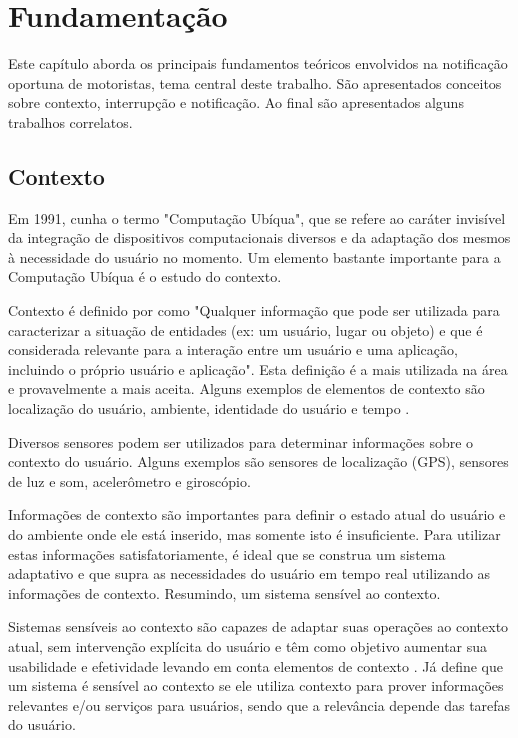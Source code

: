 
\chapter{Fundamentação}
\label{fundamentacao}
Este capítulo aborda os principais fundamentos teóricos envolvidos na notificação oportuna de motoristas,
tema central deste trabalho. São apresentados conceitos sobre contexto, interrupção e notificação.
Ao final são apresentados alguns trabalhos correlatos.

\section{Contexto}
\label{contexto}
Em 1991, \cite{weiser1991computer} cunha o termo "Computação Ubíqua", que se refere ao caráter invisível da
integração de dispositivos computacionais diversos e da adaptação dos mesmos à necessidade do usuário no momento.
Um elemento bastante importante para a Computação Ubíqua é o estudo do contexto.

Contexto é definido por \cite{dey2001understanding} como "Qualquer informação que pode ser utilizada para
caracterizar a situação de entidades (ex: um usuário, lugar ou objeto) e que é considerada relevante para
a interação entre um usuário e uma aplicação, incluindo o próprio usuário e aplicação". Esta definição é
a mais utilizada na área e provavelmente a mais aceita. Alguns exemplos de elementos de contexto são
localização do usuário, ambiente, identidade do usuário e tempo \cite{ryan1999enhanced}.

Diversos sensores podem ser utilizados para determinar informações sobre o contexto do usuário. Alguns exemplos são
sensores de localização (GPS), sensores de luz e som, acelerômetro e giroscópio.

Informações de contexto são importantes para definir o estado atual do usuário e do ambiente onde ele está inserido,
mas somente isto é insuficiente. Para utilizar estas informações satisfatoriamente, é ideal que se construa um sistema
adaptativo e que supra as necessidades do usuário em tempo real utilizando as informações de contexto. Resumindo,
um sistema sensível ao contexto.

Sistemas sensíveis ao contexto são capazes de adaptar suas operações ao contexto atual, sem intervenção
explícita do usuário e têm como objetivo aumentar sua usabilidade e efetividade levando em conta elementos
de contexto \cite{baldauf2007survey}. Já \cite{abowd1999towards} define que um sistema é sensível ao contexto
se ele utiliza contexto para prover informações relevantes e/ou serviços para usuários, sendo que a relevância
depende das tarefas do usuário.


